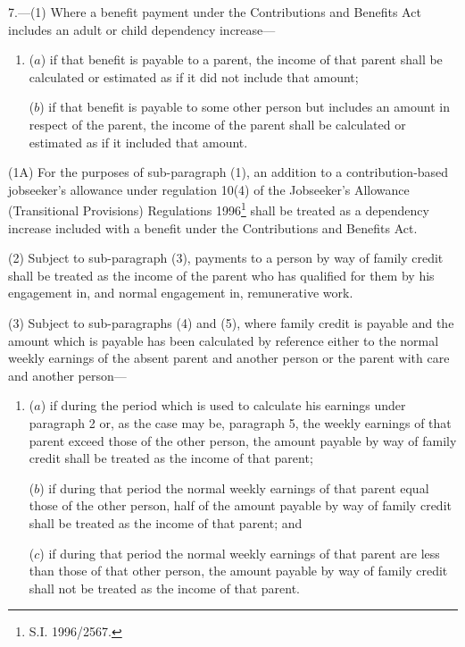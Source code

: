 \documentclass[12pt,a4paper]{article}
\begin{document}
\medskip

7.—(1) Where a benefit payment under the Contributions and Benefits Act includes an adult or child dependency increase—
\begin{enumerate}\item[]
($a$) if that benefit is payable to a parent, the income of that parent shall be calculated or estimated as if it did not include that amount;

($b$) if that benefit is payable to some other person but includes an amount in respect of the parent, the income of the parent shall be calculated or estimated as if it included that amount.
\end{enumerate}

\begin{sloppypar}
(1A) For the purposes of sub-paragraph (1), an addition to a contribution\hspace{0pt}-\hspace{0pt}based jobseeker’s allowance under 
regulation 10(4)  %
of the Jobseeker’s Allowance (Transitional Provisions) Regulations 
1996\footnote{\frenchspacing S.I. 1996/2567.}  %
shall be treated as a dependency increase included with a benefit under the Contributions and Benefits Act.
\end{sloppypar}

(2) Subject to sub-paragraph (3), payments to a person by way of family credit shall be treated as the income of the parent who has qualified for them by his engagement in, and normal engagement in, remunerative work.

(3) Subject to sub-paragraphs (4) and (5), where family credit is payable and the amount which is payable has been calculated by reference either to the 
normal  %
weekly earnings of the absent parent and another person or the parent with care and another person—
\begin{enumerate}\item[]
($a$) if during the period which is used to calculate his earnings under paragraph 2 or, as the case may be, paragraph 5, the weekly earnings of that parent exceed those of the other person, the amount payable by way of family credit shall be treated as the income of that parent;

($b$) if during that period the normal weekly earnings of that parent equal those of the other person, half of the amount payable by way of family credit shall be treated as the income of that parent; and

($c$) if during that period the normal weekly earnings of that parent are less than those of that other person, the amount payable by way of family credit shall not be treated as the income of that parent.
\end{enumerate}
\end{document}
